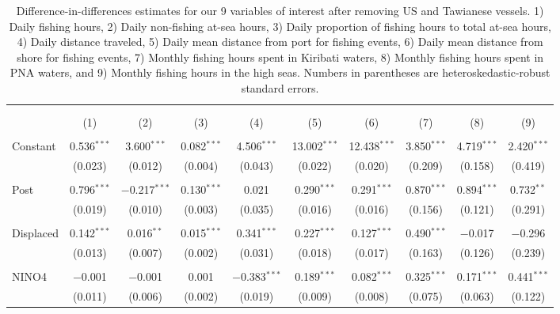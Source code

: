 
\begin{table}[H] \centering 
  \caption{\label{tab:DID_without_USA_TWN}Difference-in-differences estimates for our 9 variables of interest after removing US and Tawianese vessels. 1) Daily fishing hours, 2) Daily non-fishing at-sea hours, 3) Daily proportion of fishing hours to total at-sea hours, 4) Daily distance traveled, 5) Daily mean distance from port for fishing events, 6) Daily mean distance from shore for fishing events, 7) Monthly fishing hours spent in Kiribati waters, 8) Monthly fishing hours spent in PNA waters, and 9) Monthly fishing hours in the high seas. Numbers in parentheses are heteroskedastic-robust standard errors.} 
  \label{} 
\footnotesize 
\begin{tabular}{@{\extracolsep{1pt}}lccccccccc} 
\\[-1.8ex]\hline 
\hline \\[-1.8ex] 
\\[-1.8ex] & (1) & (2) & (3) & (4) & (5) & (6) & (7) & (8) & (9)\\ 
\hline \\[-1.8ex] 
 Constant & 0.536$^{***}$ & 3.600$^{***}$ & 0.082$^{***}$ & 4.506$^{***}$ & 13.002$^{***}$ & 12.438$^{***}$ & 3.850$^{***}$ & 4.719$^{***}$ & 2.420$^{***}$ \\ 
  & (0.023) & (0.012) & (0.004) & (0.043) & (0.022) & (0.020) & (0.209) & (0.158) & (0.419) \\ 
  & & & & & & & & & \\ 
 Post & 0.796$^{***}$ & $-$0.217$^{***}$ & 0.130$^{***}$ & 0.021 & 0.290$^{***}$ & 0.291$^{***}$ & 0.870$^{***}$ & 0.894$^{***}$ & 0.732$^{**}$ \\ 
  & (0.019) & (0.010) & (0.003) & (0.035) & (0.016) & (0.016) & (0.156) & (0.121) & (0.291) \\ 
  & & & & & & & & & \\ 
 Displaced & 0.142$^{***}$ & 0.016$^{**}$ & 0.015$^{***}$ & 0.341$^{***}$ & 0.227$^{***}$ & 0.127$^{***}$ & 0.490$^{***}$ & $-$0.017 & $-$0.296 \\ 
  & (0.013) & (0.007) & (0.002) & (0.031) & (0.018) & (0.017) & (0.163) & (0.126) & (0.239) \\ 
  & & & & & & & & & \\ 
 NINO4 & $-$0.001 & $-$0.001 & 0.001 & $-$0.383$^{***}$ & 0.189$^{***}$ & 0.082$^{***}$ & 0.325$^{***}$ & 0.171$^{***}$ & 0.441$^{***}$ \\ 
  & (0.011) & (0.006) & (0.002) & (0.019) & (0.009) & (0.008) & (0.075) & (0.063) & (0.122) \\ 

\end{tabular}
\end{table}
